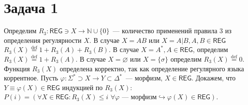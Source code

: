 \documentclass[a4paper]{article}
\def\REG{{\mathsf{REG}}}
\begin{document}
\section*{Задача 1}
Определим $R_3:\REG\ni X\longrightarrow \mathbb{N}\cup\{0\}$~--- количество применений правила $3$ из определения регулярности $X$. В случае $X=AB$ или $X=A|B, A,B\in\REG$ $R_3(X)\overset{\mathrm{def}}{=}1+R_3(A)+R_3(B)$. В случае $X=A^*, A\in\REG$, определим $R_3(X)\overset{\mathrm{def}}{=}1+R_3(A)$. В случае $X=\varnothing$ или $X=\{\sigma\}$ определим $R_3(X)\overset{\mathrm{def}}{=}0$. Функция $R_3(X)$ определена корректно, так как определение регулярного языка коррентное.\newline
Пусть $\varphi\colon\Sigma^*\supset X\longrightarrow Y\subset\Delta^*$~--- морфизм, $X\in\REG$. Докажем, что $Y\equiv\varphi(X)\in\REG$ индукцией по $R_3(X)$:
\\[5pt]
$P(i)=(\forall X\in\REG\colon R_3(X)\leqslant i\,\,\forall\varphi\mbox{~--- морфизм}\hookrightarrow \varphi(X)\in\REG)$.
\\[1pt]
\end{document}
